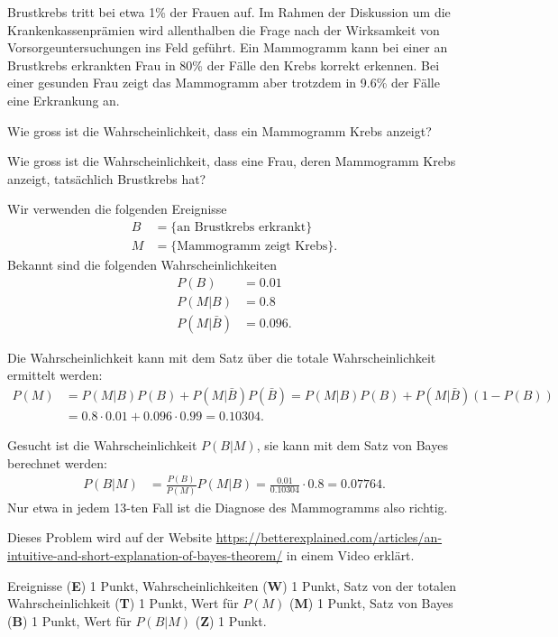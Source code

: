 Brustkrebs tritt bei etwa 1\% der Frauen auf.
Im Rahmen der Diskussion um die Krankenkassenprämien wird allenthalben
die Frage nach der Wirksamkeit von Vorsorgeuntersuchungen ins Feld 
geführt.
Ein Mammogramm kann bei einer an Brustkrebs erkrankten Frau in 80\% der
Fälle den Krebs korrekt erkennen.
Bei einer gesunden Frau zeigt das Mammogramm aber trotzdem in 9.6\% der Fälle
eine Erkrankung an.


\begin{teilaufgaben}
\item
Wie gross ist die Wahrscheinlichkeit, dass ein Mammogramm Krebs anzeigt?
\item
Wie gross ist die Wahrscheinlichkeit, dass eine Frau, deren Mammogramm
Krebs anzeigt, tatsächlich Brustkrebs hat?
\end{teilaufgaben}

\begin{loesung}
Wir verwenden die folgenden Ereignisse
\begin{align*}
B&=\{\text{an Brustkrebs erkrankt}\}
\\
M&=\{\text{Mammogramm zeigt Krebs}\}.
\end{align*}
Bekannt sind die folgenden Wahrscheinlichkeiten
\begin{align*}
P(B)&=0.01\\
P(M|B)&=0.8\\
P(M|\bar{B})&=0.096.
\end{align*}
\begin{teilaufgaben}
\item
Die Wahrscheinlichkeit kann mit dem Satz über die totale Wahrscheinlichkeit
ermittelt werden:
\begin{align*}
P(M)
&=
P(M|B) P(B) + P(M|\bar{B}) P(\bar{B})
=
P(M|B) P(B) + P(M|\bar{B}) (1-P(B))
\\
&=
0.8\cdot 0.01 + 0.096\cdot 0.99
=
0.10304.
\end{align*}
\item
Gesucht ist die Wahrscheinlichkeit $P(B|M)$, sie kann mit dem Satz von
Bayes berechnet werden:
\begin{align*}
P(B|M)
&=
\frac{P(B)}{P(M)} P(M|B)
=
\frac{0.01}{0.10304}\cdot 0.8
=
0.07764.
\end{align*}
Nur etwa in jedem 13-ten Fall ist die Diagnose des Mammogramms also richtig.
\qedhere
\end{teilaufgaben}
\end{loesung}

\begin{diskussion}
Dieses Problem wird auf der Website
\url{https://betterexplained.com/articles/an-intuitive-and-short-explanation-of-bayes-theorem/}
in einem Video erklärt.
\end{diskussion}

\begin{bewertung}
Ereignisse ({\bf E}) 1 Punkt,
Wahrscheinlichkeiten ({\bf W}) 1 Punkt,
Satz von der totalen Wahrscheinlichkeit ({\bf T}) 1 Punkt,
Wert für $P(M)$ ({\bf M}) 1 Punkt,
Satz von Bayes ({\bf B}) 1 Punkt,
Wert für $P(B|M)$ ({\bf Z}) 1 Punkt.
\end{bewertung}

